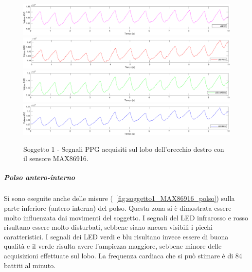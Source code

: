 \begin{figure}[h]
	\centering
	\includegraphics[width=1\linewidth]{ImageFiles/Misure Preliminari/Soggetto 1/MAX86916/lobo_ired}
	\includegraphics[width=1\linewidth]{ImageFiles/Misure Preliminari/Soggetto 1/MAX86916/lobo_red}
	\includegraphics[width=1\linewidth]{ImageFiles/Misure Preliminari/Soggetto 1/MAX86916/lobo_green}
	\includegraphics[width=1\linewidth]{ImageFiles/Misure Preliminari/Soggetto 1/MAX86916/lobo_blu}
	\caption{Soggetto 1 - Segnali PPG acquisiti sul lobo dell'orecchio destro con il sensore MAX86916.}
	\label{fig:soggetto1_MAX86916_lobo}
\end{figure}

\clearpage

\subparagraph{Polso antero-interno}

Si sono eseguite anche delle misure (\Fig~\ref{fig:soggetto1_MAX86916_polso}) sulla parte inferiore (antero-interna) del polso. Questa zona si è dimostrata essere molto influenzata dai movimenti del soggetto. I segnali del LED infrarosso e rosso risultano essere molto disturbati, sebbene siano ancora visibili i picchi caratteristici. I segnali dei LED verdi e blu risultano invece essere di buona qualità e il verde risulta avere l'ampiezza maggiore, sebbene minore delle acquisizioni effettuate sul lobo. La frequenza cardiaca che si può stimare è di 84 battiti al minuto.

